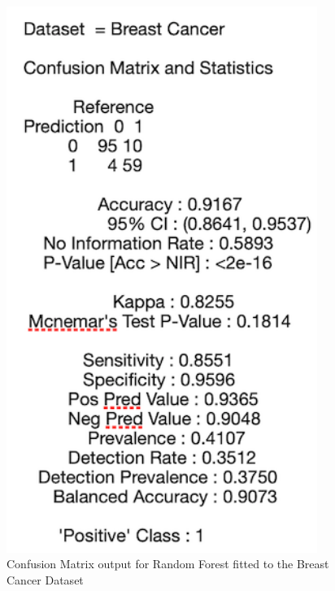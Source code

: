 \begin{figure}[!htbp]
    \begin{minipage}{0.45\textwidth}
        \centering
        \includegraphics[width=0.9\textwidth]{ThesisTemplate/appendix/images/Chapter5Appendix/ConfusionMatrix/BreastCancer.png} 
        \caption{Confusion Matrix output for Random Forest fitted to the Breast Cancer Dataset}
        \label{fig:matrixBC}
    \end{minipage}
\end{figure}

